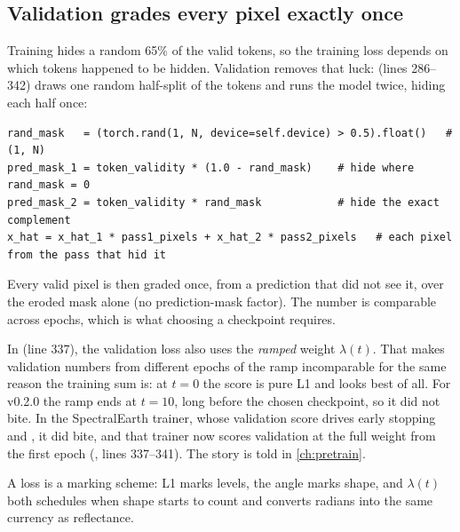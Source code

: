 \subsection{Validation grades every pixel exactly once}

Training hides a random 65\% of the valid tokens, so the training loss depends on which tokens
happened to be hidden. Validation removes that luck:  (lines
286--342) draws one random half-split of the tokens and runs the model twice, hiding each half
once:
\begin{lstlisting}
rand_mask   = (torch.rand(1, N, device=self.device) > 0.5).float()   # (1, N)
pred_mask_1 = token_validity * (1.0 - rand_mask)    # hide where rand_mask = 0
pred_mask_2 = token_validity * rand_mask            # hide the exact complement
x_hat = x_hat_1 * pass1_pixels + x_hat_2 * pass2_pixels   # each pixel from the pass that hid it
\end{lstlisting}
Every valid pixel is then graded once, from a prediction that did not see it, over the eroded
mask alone (no prediction-mask factor). The number is comparable across epochs, which is what
choosing a checkpoint requires.

\begin{sourcenote}
In  (line 337), the
validation loss also uses the \emph{ramped} weight $\lambda(t)$. That makes validation numbers
from different epochs of the ramp incomparable for the same reason the training sum is: at $t =
0$ the score is pure L1 and looks best of all. For v0.2.0 the ramp ends at $t = 10$, long
before the chosen checkpoint, so it did not bite. In the SpectralEarth trainer, whose validation
score drives early stopping and , it did bite, and that trainer now scores
validation at the full weight from the first epoch
(, lines 337--341). The story
is told in \cref{ch:pretrain}.
\end{sourcenote}

\begin{keypoint}
A loss is a marking scheme: L1 marks levels, the angle marks shape, and $\lambda(t)$ both
schedules when shape starts to count and converts radians into the same currency as
reflectance.
\end{keypoint}


